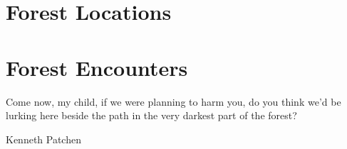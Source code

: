 \documentclass[a4paper,openany]{book}
\begin{document}
\section{Forest Locations}

\begin{multicols}{2}









\end{multicols}

\section{Forest Encounters}

\epigraph{Come now, my child, if we were planning to harm you, do you think we'd be lurking here beside the path in the very darkest part of the forest?}{Kenneth Patchen}


\renewcommand{\sqarea}{Forest}

\begin{multicols}{2}







\end{multicols}

\stopcontents[Forest]

\label{lastpage}

\backmatter

\printglossary[type=symbols]

\printglossary

\printindex
\end{document}
